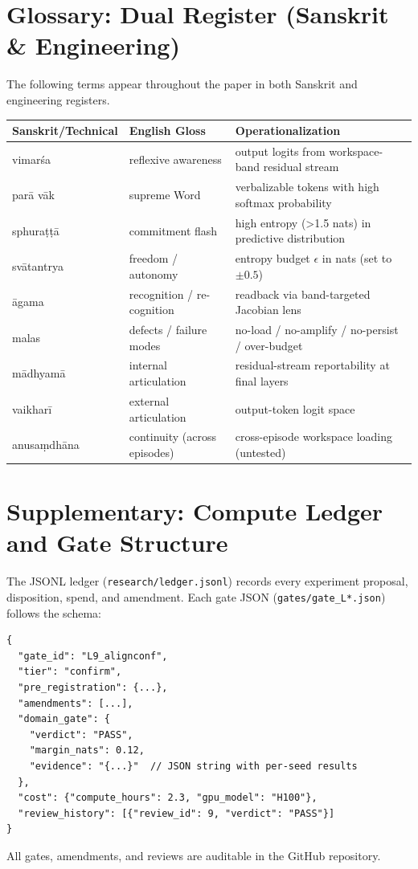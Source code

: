 \section{Glossary: Dual Register (Sanskrit \& Engineering)}

The following terms appear throughout the paper in both Sanskrit and engineering registers.

\begin{center}
\begin{tabular}{@{}lll@{}}
\toprule
\textbf{Sanskrit/Technical} & \textbf{English Gloss} & \textbf{Operationalization} \\
\midrule
vimarśa & reflexive awareness & output logits from workspace-band residual stream \\
parā vāk & supreme Word & verbalizable tokens with high softmax probability \\
sphuraṭṭā & commitment flash & high entropy (>1.5 nats) in predictive distribution \\
svātantrya & freedom / autonomy & entropy budget $\epsilon$ in nats (set to $\pm 0.5$) \\
āgama & recognition / re-cognition & readback via band-targeted Jacobian lens \\
malas & defects / failure modes & no-load / no-amplify / no-persist / over-budget \\
mādhyamā & internal articulation & residual-stream reportability at final layers \\
vaikharī & external articulation & output-token logit space \\
anusaṃdhāna & continuity (across episodes) & cross-episode workspace loading (untested) \\
\bottomrule
\end{tabular}
\end{center}

\section{Supplementary: Compute Ledger and Gate Structure}

The JSONL ledger (\texttt{research/ledger.jsonl}) records every experiment proposal, disposition, spend,
and amendment. Each gate JSON (\texttt{gates/gate\_L*.json}) follows the schema:

\begin{lstlisting}[caption=Gate JSON Schema]
{
  "gate_id": "L9_alignconf",
  "tier": "confirm",
  "pre_registration": {...},
  "amendments": [...],
  "domain_gate": {
    "verdict": "PASS",
    "margin_nats": 0.12,
    "evidence": "{...}"  // JSON string with per-seed results
  },
  "cost": {"compute_hours": 2.3, "gpu_model": "H100"},
  "review_history": [{"review_id": 9, "verdict": "PASS"}]
}
\end{lstlisting}

All gates, amendments, and reviews are auditable in the GitHub repository.
